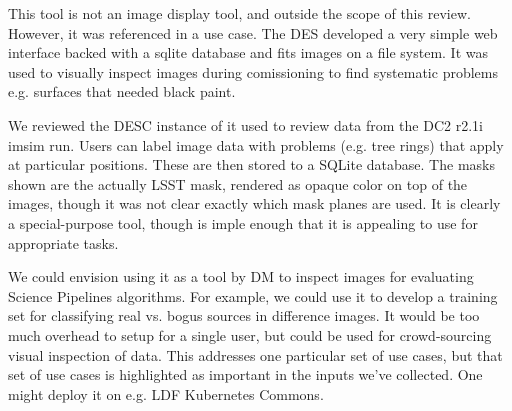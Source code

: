 This tool is not an image display tool, and outside the scope of this review.
However, it was referenced in a use case.
The DES developed a very simple web interface backed with a sqlite database and fits images on a file system.
It was used to visually inspect images during comissioning to find systematic problems e.g. surfaces that needed black paint.

We reviewed the DESC instance of it used to review data from the  DC2 r2.1i imsim run.
Users can label image data with problems (e.g. tree rings) that apply at particular positions.
These are then stored to a SQLite database.
The masks shown are the actually LSST mask, rendered as opaque color on top of the images, though it was not clear exactly which mask planes are used.
It is clearly a special-purpose tool, though is imple enough that it is appealing to use for appropriate tasks.

We could envision using it as a tool by DM to inspect images for evaluating Science Pipelines algorithms.
For example, we could use it to develop a training set for classifying real vs. bogus sources in difference images.
It would be too much overhead to setup for a single user, but could be used for crowd-sourcing visual inspection of data.
This addresses one particular set of use cases, but that set of use cases is highlighted as important in the inputs we've collected.
One might deploy it on e.g. LDF Kubernetes Commons.

